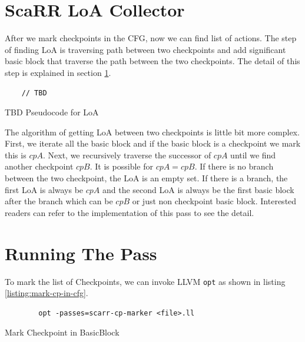 \section{ScaRR LoA Collector} \label{sec:scarr-loa-collector} After we mark
checkpoints in the CFG, now we can find list of actions. The step of finding LoA
is traversing path between two checkpoints and add significant basic block that
traverse the path between the two checkpoints. The detail of this step is
explained in section \ref{sec:scarr-loa-collector}.


\begin{listing}[htbp]
    \begin{verbatim}
    // TBD
    \end{verbatim}
    \caption{TBD Pseudocode for LoA}
    \label{listing:loa-pseudocode}
\end{listing}

The algorithm of getting LoA between two checkpoints is little bit more complex.
First, we iterate all the basic block and if the basic block is a checkpoint we
mark this is $cpA$. Next, we recursively traverse the successor of $cpA$ until
we find another checkpoint $cpB$. It is possible for $cpA = cpB$. If there is no
branch between the two checkpoint, the LoA is an empty set. If there is a
branch, the first LoA is always be $cpA$ and the second LoA is always be the
first basic block after the branch \textemdash{} which can be $cpB$ or just non
checkpoint basic block. Interested readers can refer to the implementation of
this pass to see the detail.

\section{Running The Pass}

To mark the list of Checkpoints, we can invoke LLVM \texttt{opt} as shown in
listing \ref{listing:mark-cp-in-cfg}.

\begin{listing}[htbp]
    \begin{verbatim}
        opt -passes=scarr-cp-marker <file>.ll
    \end{verbatim}
    \caption{Mark Checkpoint in BasicBlock}    
    \label{listing:mark-cp-in-cfg}
\end{listing}

